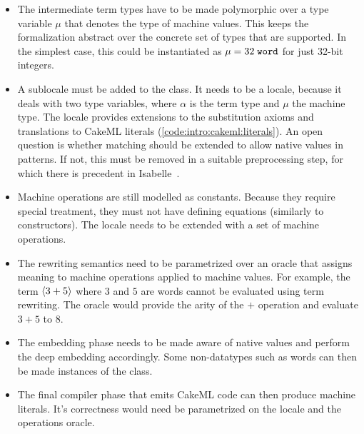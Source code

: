 \begin{itemize}
  \item
    The intermediate term types have to be made polymorphic over a type variable $\mu$ that denotes the type of machine values.
    This keeps the formalization abstract over the concrete set of types that are supported.
    In the simplest case, this could be instantiated as $\mu = 32\;\texttt{\textup{word}}$ for just 32-bit integers.
  \item
    A sublocale  must be added to the  class.
    It needs to be a locale, because it deals with two type variables, where $\alpha$ is the term type and $\mu$ the machine type.
    The locale provides extensions to the substitution axioms and translations to CakeML literals (\cref{code:intro:cakeml:literals}).
    An open question is whether matching should be extended to allow native values in patterns.
    If not, this must be removed in a suitable preprocessing step, for which there is precedent in Isabelle~\cite[§7.3]{haftmann2018code}.
  \item
    Machine operations are still modelled as constants.
    Because they require special treatment, they must not have defining equations (similarly to constructors).
    The  locale needs to be extended with a set of machine operations.
  \item
    The rewriting semantics need to be parametrized over an oracle that assigns meaning to machine operations applied to machine values.
    For example, the term $\left\langle3 + 5\right\rangle$ where $3$ and $5$ are words cannot be evaluated using term rewriting.
    The oracle would provide the arity of the $+$ operation and evaluate $3 + 5$ to $8$.
  \item
    The embedding phase needs to be made aware of native values and perform the deep embedding accordingly.
    Some non-datatypes such as words can then be made instances of the  class.
  \item
    The final compiler phase that emits CakeML code can then produce machine literals.
    It's correctness would need be parametrized on the  locale and the operations oracle.
\end{itemize}